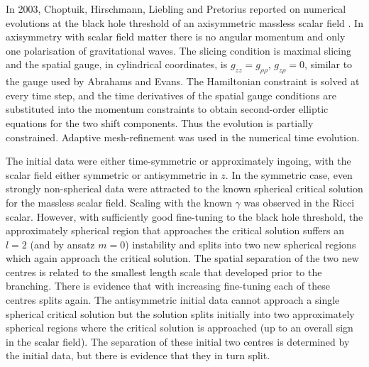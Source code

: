 \documentclass{article}
\begin{document}
In 2003, Choptuik, Hirschmann, Liebling and Pretorius
reported on numerical evolutions
at the black hole threshold of an axisymmetric massless scalar field
\cite{Choptuik_axisymmetry}. In axisymmetry with scalar field matter
there is no angular momentum and only one
polarisation of gravitational waves. The slicing condition is maximal
slicing and the spatial gauge, in cylindrical coordinates, is
$g_{zz}=g_{\rho\rho}$, $g_{z\rho}=0$, similar to the gauge used by
Abrahams and Evans. The Hamiltonian constraint is solved at every time
step, and the time derivatives of the spatial gauge conditions are
substituted into the momentum constraints to obtain second-order
elliptic equations for the two shift components. Thus the evolution is
partially constrained. Adaptive mesh-refinement was used in the
numerical time evolution. 

The initial data were either time-symmetric or approximately ingoing, with
the scalar field either symmetric or antisymmetric in $z$. In the
symmetric case, even strongly non-spherical data were attracted to the
known spherical critical solution for the massless scalar
field. Scaling with the known $\gamma$ was observed in the Ricci
scalar. However, with sufficiently good fine-tuning to the black hole
threshold, the approximately spherical region that approaches the
critical solution suffers an $l=2$ (and by ansatz $m=0$) instability
and splits into two new spherical regions which again
approach the critical solution. The spatial separation of the two new
centres is related to the smallest length scale that developed prior
to the branching. There is evidence that with increasing fine-tuning
each of these centres splits again. The antisymmetric initial data
cannot approach a single spherical critical solution but the solution
splits initially into two approximately spherical regions where the
critical solution is approached (up to an overall sign in the scalar
field). The separation of these initial two centres is determined by
the initial data, but there is evidence that they in turn split.
\end{document}
